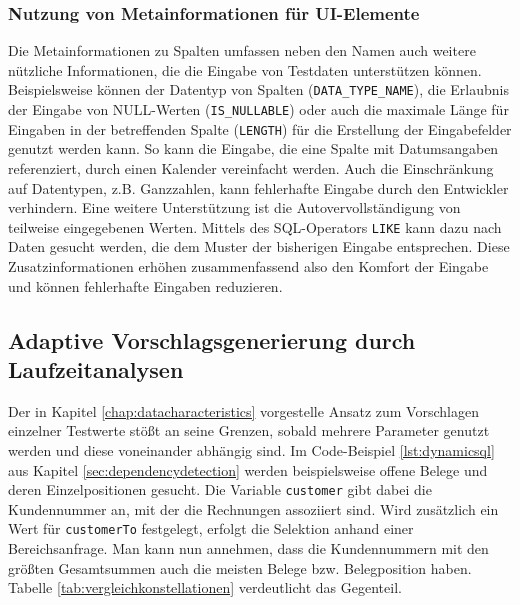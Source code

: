 \subsubsection{Nutzung von Metainformationen für UI-Elemente}
Die Metainformationen zu Spalten umfassen neben den Namen auch weitere nützliche Informationen, die die Eingabe von Testdaten unterstützen können.
Beispielsweise können der Datentyp von Spalten (\texttt{DATA\_TYPE\_NAME}), die Erlaubnis der Eingabe von NULL-Werten (\texttt{IS\_NULLABLE}) oder auch die maximale Länge für Eingaben in der betreffenden Spalte (\texttt{LENGTH}) für die Erstellung der Eingabefelder genutzt werden kann.
So kann die Eingabe, die eine Spalte mit Datumsangaben referenziert, durch einen Kalender vereinfacht werden.
Auch die Einschränkung auf Datentypen, z.B. Ganzzahlen, kann fehlerhafte Eingabe durch den Entwickler verhindern.
Eine weitere Unterstützung ist die Autovervollständigung von teilweise eingegebenen Werten.
Mittels des SQL-Operators \texttt{LIKE} kann dazu nach Daten gesucht werden, die dem Muster der bisherigen Eingabe entsprechen.
Diese Zusatzinformationen erhöhen zusammenfassend also den Komfort der Eingabe und können fehlerhafte Eingaben reduzieren.

\subsection{Adaptive Vorschlagsgenerierung durch Laufzeitanalysen}\label{chap:adaptive}
Der in Kapitel \ref{chap:datacharacteristics} vorgestelle Ansatz zum Vorschlagen einzelner Testwerte stößt an seine Grenzen, sobald mehrere Parameter genutzt werden und diese voneinander abhängig sind.
Im Code-Beispiel \ref{lst:dynamicsql} aus Kapitel \ref{sec:dependencydetection} werden beispielsweise offene Belege und deren Einzelpositionen gesucht.
Die Variable \texttt{customer} gibt dabei die Kundennummer an, mit der die Rechnungen assoziiert sind.
Wird zusätzlich ein Wert für \texttt{customerTo} festgelegt, erfolgt die Selektion anhand einer Bereichsanfrage.
Man kann nun annehmen, dass die Kundennummern mit den größten Gesamtsummen auch die meisten Belege bzw. Belegposition haben.
Tabelle \ref{tab:vergleichkonstellationen} verdeutlicht das Gegenteil.

